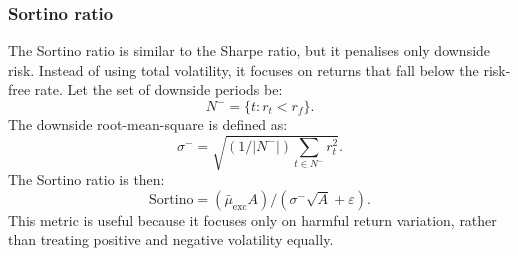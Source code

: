 \documentclass[a4paper,fleqn]{cas-sc}
\begin{document}
\subsubsection{Sortino ratio}\par
The Sortino ratio is similar to the Sharpe ratio, but it penalises only downside risk. Instead of using total volatility, it focuses on returns that fall below the risk-free rate. Let the set of downside periods be:
\begin{equation}
N^{-} = \{t : r_t < r_f\}.
\label{eq:downside-set}
\end{equation}
The downside root-mean-square is defined as:
\begin{equation}
\sigma^{-} = \sqrt{(1/|N^{-}|)\sum_{t \in N^{-}} r_t^{2}}.
\label{eq:downside-rms}
\end{equation}
The Sortino ratio is then:
\begin{equation}
\mathrm{Sortino} = (\bar{\mu}_{\mathrm{exc}} A)/(\sigma^{-}\sqrt{A} + \varepsilon).
\label{eq:sortino}
\end{equation}
This metric is useful because it focuses only on harmful return variation, rather than treating positive and negative volatility equally.
\end{document}
